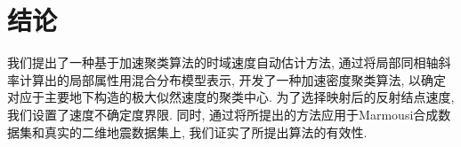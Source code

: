 \section{结论}
我们提出了一种基于加速聚类算法的时域速度自动估计方法, 通过将局部同相轴斜率计算出的局部属性用混合分布模型表示, 开发了一种加速密度聚类算法, 以确定对应于主要地下构造的极大似然速度的聚类中心. 为了选择映射后的反射结点速度, 我们设置了速度不确定度界限. 同时, 通过将所提出的方法应用于Marmousi合成数据集和真实的二维地震数据集上, 我们证实了所提出算法的有效性. 
